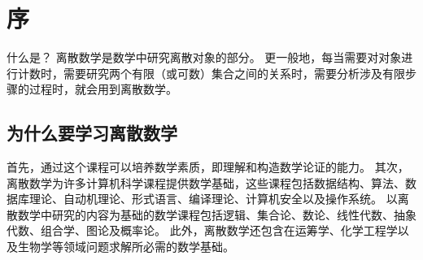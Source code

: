 \chapter{序}
{
    什么是？
    离散数学是数学中研究离散对象的部分。
    更一般地，每当需要对对象进行计数时，需要研究两个有限（或可数）集合之间的关系时，需要分析涉及有限步骤的过程时，就会用到离散数学。

    \section{为什么要学习离散数学}
    {
        首先，通过这个课程可以培养数学素质，即理解和构造数学论证的能力。
        其次，离散数学为许多计算机科学课程提供数学基础，这些课程包括数据结构、算法、数据库理论、自动机理论、形式语言、编译理论、计算机安全以及操作系统。
        以离散数学中研究的内容为基础的数学课程包括逻辑、集合论、数论、线性代数、抽象代数、组合学、图论及概率论。
        此外，离散数学还包含在运筹学、化学工程学以及生物学等领域问题求解所必需的数学基础。
    }
}
\cleardoublepage

\endinput
